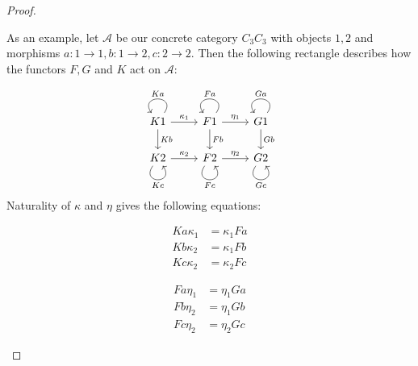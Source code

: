 \begin{proof}
\begin{enumerate}
\begin{subproof}
As an example, let $\mathcal{A}$ be our concrete category $C_{3}C_{3}$ with objects $1,2$ and morphisms
$a : 1\rightarrow 1, b : 1 \rightarrow 2, c : 2 \rightarrow 2$. Then the following rectangle describes how the functors $F,G$ and $K$ act on
$\mathcal{A}$:

\[
\begin{tikzcd}
K1 \arrow["Ka"', loop, distance=2em, in=125, out=55] \arrow[d, "Kb"] \arrow[r, "\kappa_{1}"] & F1 \arrow["Fa"', loop, distance=2em, in=125, out=55] \arrow[d, "Fb"] \arrow[r, "\eta_{1}"] & G1 \arrow["Ga"', loop, distance=2em, in=125, out=55] \arrow[d, "Gb"] \\
K2 \arrow["Kc"', loop, distance=2em, in=305, out=235] \arrow[r, "\kappa_{2}"]                & F2 \arrow["Fc"', loop, distance=2em, in=305, out=235] \arrow[r, "\eta_{2}"]                & G2 \arrow["Gc"', loop, distance=2em, in=305, out=235]               
\end{tikzcd}
\]
Naturality of $\kappa$ and $\eta$ gives the following equations:\\
\begin{minipage}{.20\textwidth}
\phantom{}
\end{minipage}
\begin{minipage}{.28\textwidth}
\begin{subequations}
\begin{align}
Ka \kappa_{1} &=\label{eq:natural_Ka_kappa_kappa_Fa}
 \kappa_{1} Fa \\
Kb \kappa_{2} &= \kappa_{1} Fb \\
Kc \kappa_{2} &= \kappa_{2} Fc
\end{align}
\end{subequations}
\end{minipage}
\begin{minipage}{.04\textwidth}
\phantom{}
\end{minipage}
\begin{minipage}{.28\textwidth}
\begin{subequations}
\begin{align}
Fa \eta_{1} &= \eta_{1} Ga \\
Fb \eta_{2} &= \eta_{1} Gb \\
Fc \eta_{2} &= \eta_{2} Gc
\end{align}
\end{subequations}
\end{minipage}
\begin{minipage}{.20\textwidth}
\phantom{}
\end{minipage}


\end{subproof}
\end{enumerate}
\end{proof}
